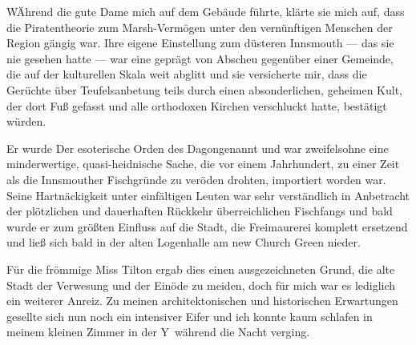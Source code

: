 WÄhrend die gute Dame mich auf dem Gebäude führte, klärte sie mich auf, dass die Piratentheorie zum Marsh-Vermögen unter den vernünftigen Menschen der Region gängig war. Ihre eigene Einstellung zum düsteren Innsmouth --- das sie nie gesehen hatte --- war eine geprägt von Abscheu gegenüber einer Gemeinde, die auf der kulturellen Skala weit abglitt und sie versicherte mir, dass die Gerüchte über Teufelsanbetung teils durch einen absonderlichen, geheimen Kult, der dort Fuß gefasst und alle orthodoxen Kirchen verschluckt hatte, bestätigt würden.

Er wurde \glqq Der esoterische Orden des Dagon\grqq  genannt und war zweifelsohne eine minderwertige, quasi-heidnische Sache, die vor einem Jahrhundert, zu einer Zeit als die Innsmouther Fischgründe zu veröden drohten, importiert worden war. Seine Hartnäckigkeit unter einfältigen Leuten war sehr verständlich in Anbetracht der plötzlichen und dauerhaften Rückkehr überreichlichen Fischfangs und bald wurde er zum größten Einfluss auf die Stadt, die Freimaurerei komplett ersetzend und ließ sich bald in der alten Logenhalle am new Church Green nieder.

Für die frömmige Miss Tilton ergab dies einen ausgezeichneten Grund, die alte Stadt der Verwesung und der Einöde zu meiden,  doch für mich war es lediglich ein weiterer Anreiz. Zu meinen architektonischen und historischen Erwartungen gesellte sich nun noch ein intensiver Eifer und ich konnte kaum schlafen in meinem kleinen Zimmer in der \glqq Y\grqq\ während die Nacht verging.
